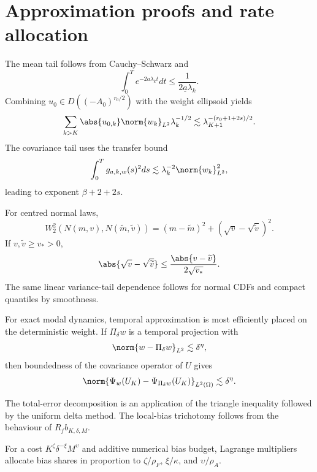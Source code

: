 \section{Approximation proofs and rate allocation}

The mean tail follows from Cauchy--Schwarz and
\[
 \int_0^Te^{-2a\lambda_kt}dt\le\frac1{2\underline a\lambda_k}.
\]
Combining $u_0\in D((-A_0)^{r_0/2})$ with the weight ellipsoid yields
\[
 \sum_{k>K}\abs{u_{0,k}}\norm{w_k}_{L^2}\lambda_k^{-1/2}
 \lesssim\lambda_{K+1}^{-(r_0+1+2s)/2}.
\]
The covariance tail uses the transfer bound
\[
 \int_0^Tg_{a,k,w}(s)^2ds
 \lesssim\lambda_k^{-2}\norm{w_k}_{L^2}^2,
\]
leading to exponent $\beta+2+2s$.

For centred normal laws,
\[
 W_2^2(N(m,v),N(\widetilde m,\widetilde v))
 =(m-\widetilde m)^2+(\sqrt v-\sqrt{\widetilde v})^2.
\]
If $v,\widetilde v\ge v_*>0$,
\[
 \abs{\sqrt v-\sqrt{\widetilde v}}
 \le\frac{\abs{v-\widetilde v}}{2\sqrt{v_*}}.
\]
The same linear variance-tail dependence follows for normal CDFs and compact quantiles by smoothness.

For exact modal dynamics, temporal approximation is most efficiently placed on the deterministic weight. If $\Pi_\delta w$ is a temporal projection with
\[
 \norm{w-\Pi_\delta w}_{L^2}\lesssim\delta^\eta,
\]
then boundedness of the covariance operator of $U$ gives
\[
 \norm{\Psi_w(U_K)-\Psi_{\Pi_\delta w}(U_K)}_{L^2(\Omega)}
 \lesssim\delta^\eta.
\]

The total-error decomposition is an application of the triangle inequality followed by the uniform delta method. The local-bias trichotomy follows from the behaviour of $R_fb_{K,\delta,M}$.

For a cost $K^\zeta\delta^{-\xi}M^\upsilon$ and additive numerical bias budget, Lagrange multipliers allocate bias shares in proportion to $\zeta/\rho_F$, $\xi/\kappa$, and $\upsilon/\rho_A$.

